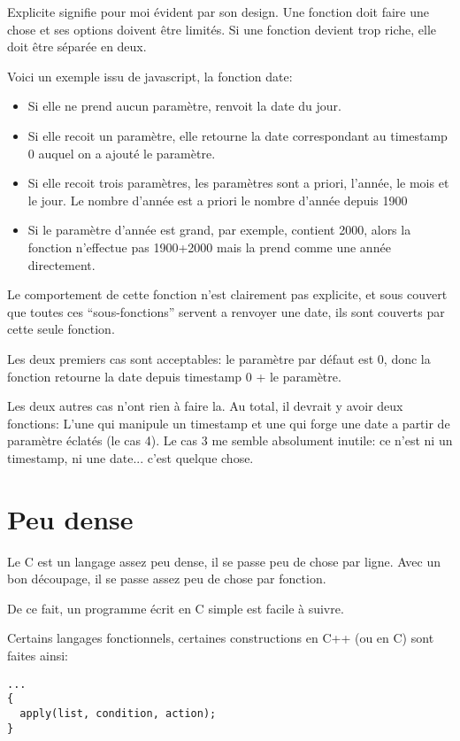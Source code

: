 \documentclass[a5paper, 12pt]{book}
\begin{document}
Explicite signifie pour moi évident par son design. Une
fonction doit faire une chose et ses options doivent être
limités. Si une fonction devient trop riche, elle doit être séparée
en deux.

Voici un exemple issu de javascript, la fonction date:

\begin{itemize}
  \item Si elle ne prend aucun paramètre, renvoit la date du jour.
  \item Si elle recoit un paramètre, elle retourne la date correspondant
    au timestamp 0 auquel on a ajouté le paramètre.
  \item Si elle recoit trois paramètres, les paramètres sont a priori,
    l'année, le mois et le jour. Le nombre d'année est a priori le nombre
    d'année depuis 1900
  \item Si le paramètre d'année est grand, par exemple, contient 2000,
    alors la fonction n'effectue pas 1900+2000 mais la prend comme une
    année directement.
\end{itemize}

Le comportement de cette fonction n'est clairement pas explicite, et
sous couvert que toutes ces ``sous-fonctions'' servent a renvoyer
une date, ils sont couverts par cette seule fonction.

Les deux premiers cas sont acceptables: le paramètre par défaut est 0,
donc la fonction retourne la date depuis timestamp 0 + le paramètre.

Les deux autres cas n'ont rien à faire la. Au total, il devrait y avoir
deux fonctions: L'une qui manipule un timestamp et une qui forge une date
a partir de paramètre éclatés (le cas 4). Le cas 3 me semble absolument inutile:
ce n'est ni un timestamp, ni une date... c'est quelque chose.

\section{Peu dense}

Le C est un langage assez peu dense, il se passe peu de chose par
ligne. Avec un bon découpage, il se passe assez peu de chose par fonction.

De ce fait, un programme écrit en C simple est facile à suivre.

Certains langages fonctionnels, certaines constructions en C++ (ou en C)
sont faites ainsi:\\

\begin{verbatim}
...
{
  apply(list, condition, action);
}
\end{verbatim}
\end{document}
